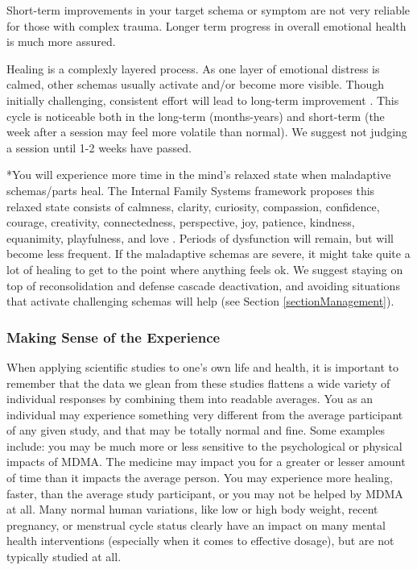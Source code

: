\documentclass[12pt,letterpaper]{book}
\begin{document}
Short-term improvements in your target schema or symptom are not very reliable for those with complex trauma. Longer term progress in overall emotional health is much more assured.

Healing is a complexly layered process. As one layer of emotional distress is calmed, other schemas usually activate and/or become more visible. Though initially challenging, consistent effort will lead to long-term improvement \cite{vanderKolkBody}. This cycle is noticeable both in the long-term (months-years) and short-term (the week after a session may feel more volatile than normal). We suggest not judging a session until 1-2 weeks have passed.

*You will experience more time in the mind's relaxed state when maladaptive schemas/parts heal. The Internal Family Systems framework proposes this relaxed state consists of calmness, clarity, curiosity, compassion, confidence, courage, creativity, connectedness, perspective, joy, patience, kindness, equanimity, playfulness, and love \cite{schwartzIFS}. Periods of dysfunction will remain, but will become less frequent. If the maladaptive schemas are severe, it might take quite a lot of healing to get to the point where anything feels ok. We suggest staying on top of reconsolidation and defense cascade deactivation, and avoiding situations that activate challenging schemas will help (see Section \ref{sectionManagement}).
\subsubsection{Making Sense of the Experience}
\label{sectionMakingSense}
When applying scientific studies to one's own life and health, it is important to remember that the data we glean from these studies flattens a wide variety of individual responses by combining them into readable averages. You as an individual may experience something very different from the average participant of any given study, and that may be totally normal and fine. Some examples include: you may be much more or less sensitive to the psychological or physical impacts of MDMA. The medicine may impact you for a greater or lesser amount of time than it impacts the average person. You may experience more healing, faster, than the average study participant, or you may not be helped by MDMA at all. Many normal human variations, like low or high body weight, recent pregnancy, or menstrual cycle status clearly have an impact on many mental health interventions (especially when it comes to effective dosage), but are not typically studied at all.
\end{document}

